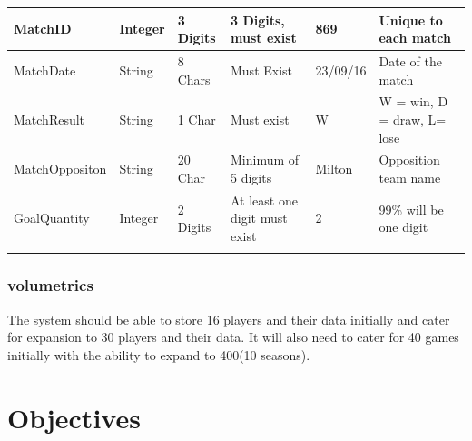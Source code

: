\begin{table}[]
\begin{tabular}{llllll}
\multicolumn{1}{|l|}{MatchID}        & \multicolumn{1}{l|}{Integer}   & \multicolumn{1}{l|}{3 Digits} & \multicolumn{1}{l|}{3 Digits, must exist}                                           & \multicolumn{1}{l|}{869}             & \multicolumn{1}{l|}{Unique to each match}                            \\ \hline
\multicolumn{1}{|l|}{MatchDate}      & \multicolumn{1}{l|}{String}    & \multicolumn{1}{l|}{8 Chars}  & \multicolumn{1}{l|}{Must Exist}                                                     & \multicolumn{1}{l|}{23/09/16}        & \multicolumn{1}{l|}{Date of the match}                               \\ \hline
\multicolumn{1}{|l|}{MatchResult}    & \multicolumn{1}{l|}{String}    & \multicolumn{1}{l|}{1 Char}   & \multicolumn{1}{l|}{Must exist}                                                     & \multicolumn{1}{l|}{W}               & \multicolumn{1}{l|}{W = win, D = draw,  L= lose}                     \\ \hline
\multicolumn{1}{|l|}{MatchOppositon} & \multicolumn{1}{l|}{String}    & \multicolumn{1}{l|}{20 Char}  & \multicolumn{1}{l|}{Minimum of 5 digits}                                            & \multicolumn{1}{l|}{Milton}          & \multicolumn{1}{l|}{Opposition team name}                            \\ \hline
\multicolumn{1}{|l|}{GoalQuantity}   & \multicolumn{1}{l|}{Integer}   & \multicolumn{1}{l|}{2 Digits} & \multicolumn{1}{l|}{At least one digit must exist}                                  & \multicolumn{1}{l|}{2}               & \multicolumn{1}{l|}{99\% will be one digit}                          \\ \hline
                                     &                                &                               &                                                                                     &                                      &                                                                     
\end{tabular}
\end{table}

\subsubsection{volumetrics}
The system should be able to store 16 players and their data initially and cater for expansion to 30 players and their data. It will also need to cater for 40 games initially with the ability to expand to 400(10 seasons). 
\section{Objectives}

